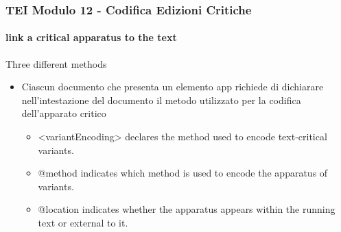 \begin{frame}
    \frametitle{TEI Modulo 12 - Codifica Edizioni Critiche}
    \framesubtitle{link a critical apparatus to the text}
    \addtocounter{nframe}{1}
  





    \begin{block}{Three different methods}
       \begin{itemize}
           \item Ciascun documento che presenta un elemento app richiede di dichiarare nell'intestazione del documento il metodo utilizzato per la codifica dell'apparato critico
           \begin{itemize}
             \item <variantEncoding> declares the method used to encode text-critical variants.
             \item @method indicates which method is used to encode the apparatus of variants.
             \item @location indicates whether the apparatus appears within the running text or external to it.
           \end{itemize}
       \end{itemize}
     \end{block}

\end{frame}


